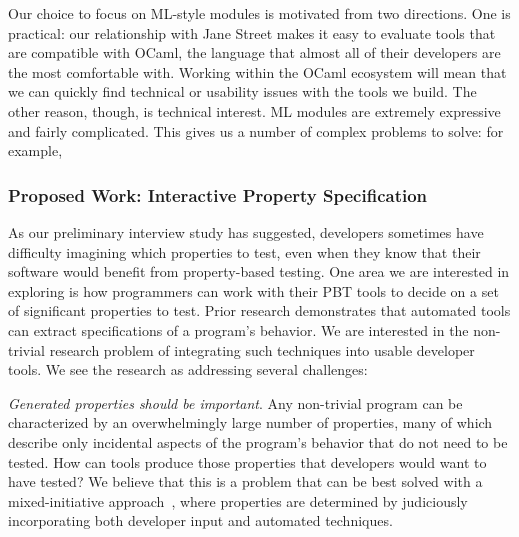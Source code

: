 Our choice to focus on ML-style modules is motivated from two directions. One is
practical: our relationship with Jane Street makes it easy to evaluate tools
that are compatible with OCaml, the language that almost all of their developers
are the most comfortable with. Working within the OCaml ecosystem will mean that
we can quickly find technical or usability issues with the tools we build. The
other reason, though, is technical interest. ML modules are extremely
expressive and fairly complicated. This gives us a number of complex problems to
solve: for example, 

\subsubsection{Proposed Work: Interactive Property Specification}

 

As our preliminary interview study has suggested, developers sometimes have
difficulty imagining which properties to test, even when they know that their
software would benefit from property-based testing. One area we are interested
in exploring is how programmers can work with their PBT tools to decide on a set
of significant properties to test.  Prior research demonstrates that automated
tools can extract specifications of a program's
behavior\cite{ammons2002mining,le2018deep,claessen2010quickspec}. We are
interested in the non-trivial research problem of integrating such techniques
into usable developer tools. We see the research as addressing several
challenges:

\textit{Generated properties should be \emph{important}}. Any non-trivial
program can be characterized by an overwhelmingly large number of properties,
many of which describe only incidental aspects of the program's behavior that do
not need to be tested. How can tools produce those properties that developers
would want to have tested? We believe that this is a problem that can be best
solved with a mixed-initiative approach~\cite{allen1999mixed}, where properties
are determined by judiciously incorporating both developer input and automated
techniques.

